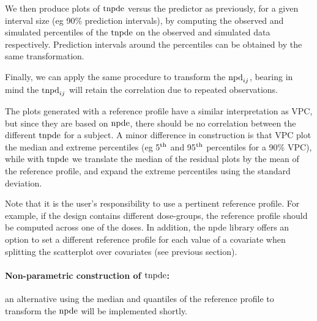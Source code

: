 We then produce plots of ${\rm tnpde}$ versus the predictor as previously, for a given interval size (eg 90\% prediction 
intervals), by computing the observed and simulated percentiles of the ${\rm tnpde}$ on the observed and simulated data 
respectively. Prediction intervals around the percentiles can be obtained by the same transformation.

Finally, we can apply the same procedure to transform the ${\rm npd}_{ij}$, bearing in mind the ${\rm tnpd}_{ij}$ will retain 
the correlation due to repeated observations.

The plots generated with a reference profile have a similar interpretation as VPC, but since they are based on 
${\rm npde}$, there should be no correlation between the different ${\rm tnpde}$ for a subject. A minor difference in 
construction is that VPC plot the median and extreme percentiles (eg 5$^{\rm th}$ and 95$^{\rm th}$ percentiles for 
a 90\% VPC), while with ${\rm tnpde}$ we translate the median of the residual plots by the mean of the reference 
profile, and expand the extreme percentiles using the standard deviation. 

Note that it is the user's responsibility to use a pertinent reference profile. For example, if the design 
contains different dose-groups, the reference profile should be computed across one of the doses. In addition, the 
{\sf npde} library offers an option to set a different reference profile for each value of a covariate when 
splitting the scatterplot over covariates (see previous section).


\paragraph{Non-parametric construction of ${\rm tnpde}$:} an alternative using the median and quantiles of the 
reference profile to transform the ${\rm npde}$ will be implemented shortly.


